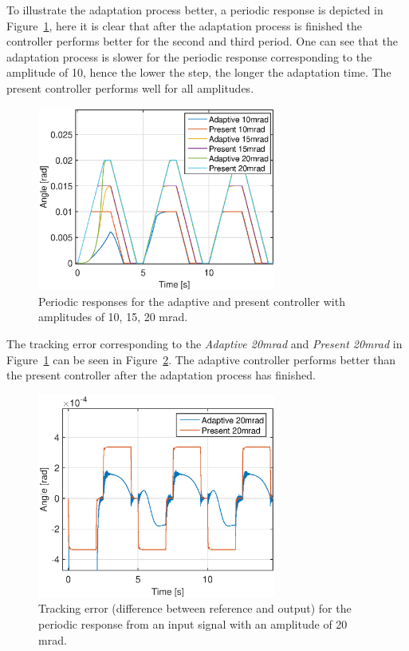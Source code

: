 To illustrate the adaptation process better, a periodic response is depicted in Figure~\ref{fig:periodic_resp}, here it is clear that after the adaptation process is finished the controller performs better for the second and third period. One can see that the adaptation process is slower for the periodic response corresponding to the amplitude of \unit{10}{\milli\radian}, hence the lower the step, the longer the adaptation time. The present controller performs well for all amplitudes.

\begin{figure}[h!]
  \centering
  \includegraphics[width=0.7\textwidth]{fig/matlab/periodicresponse.eps}
  \caption{\label{fig:periodic_resp} Periodic responses for the adaptive and present controller with amplitudes of 10, 15, 20 mrad.}
\end{figure}

The tracking error corresponding to the \emph{Adaptive 20mrad} and \emph{Present 20mrad} in Figure~\ref{fig:periodic_resp} can be seen in Figure~\ref{fig:adapt_trackingerror}. The adaptive controller performs better than the present controller after the adaptation process has finished.
\begin{figure}[h!]
  \centering
  \includegraphics[width=0.7\textwidth]{fig/matlab/trackingerror.eps}
  \caption{\label{fig:adapt_trackingerror} Tracking error (difference between reference and output) for the periodic response from an input signal with an amplitude of 20 mrad.}
\end{figure}


